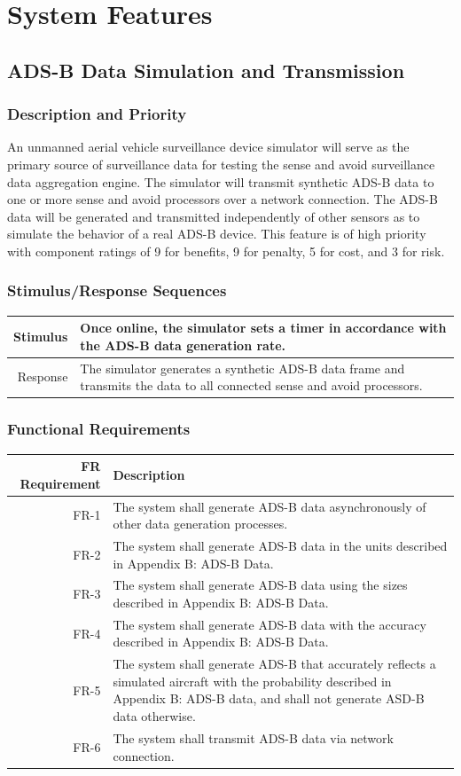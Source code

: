 \documentclass[12pt,oneside,letterpaper]{article}
\begin{document}
\section{System Features}

\subsection{ADS-B Data Simulation and Transmission}
\subsubsection{Description and Priority}
An unmanned aerial vehicle surveillance device simulator will serve as the primary source of surveillance data for testing the sense and avoid surveillance data aggregation engine. The simulator will transmit synthetic ADS-B data to one or more sense and avoid processors over a network connection. The ADS-B data will be generated and transmitted independently of other sensors as to simulate the behavior of a real ADS-B device. This feature is of high priority with component ratings of 9 for benefits, 9 for penalty, 5 for cost, and 3 for risk.
\subsubsection{Stimulus/Response Sequences}
\begin{longtable}{|r|p{3.8in}|}
\hline
Stimulus & Once online, the simulator sets a timer in accordance with the ADS-B data generation rate.\\
\hline
Response & The simulator generates a synthetic ADS-B data frame and transmits the data to all connected sense and avoid processors.\\
\hline
\end{longtable}
\subsubsection{Functional Requirements}
\begin{longtable}{|r|p{3.8in}|}
\hline
FR Requirement & Description \\
\hline
FR-1 & The system shall generate ADS-B data asynchronously of other data generation processes. \\
\hline
FR-2 & The system shall generate ADS-B data in the units described in Appendix B: ADS-B Data. \\
\hline
FR-3 & The system shall generate ADS-B data using the sizes described in Appendix B: ADS-B Data. \\
\hline
FR-4 & The system shall generate ADS-B data with the accuracy described in Appendix B: ADS-B Data. \\
\hline
FR-5 & The system shall generate ADS-B that accurately reflects a simulated aircraft with the probability described in Appendix B: ADS-B data, and shall not generate ASD-B data otherwise. \\
\hline
FR-6 & The system shall transmit ADS-B data via network connection. \\
\hline
\end{longtable}
\end{document}
